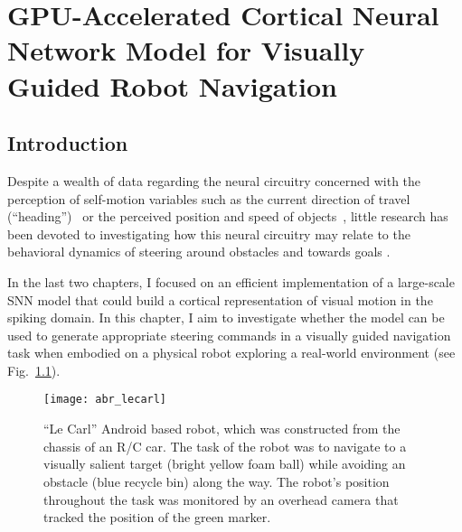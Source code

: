 \chapter{GPU-Accelerated Cortical Neural Network Model for 
Visually Guided Robot Navigation}
\label{ch:ABR}

\section{Introduction}
Despite a wealth of data regarding the neural
circuitry concerned with the perception of self-motion variables
such as the current direction of travel
(``heading'')~\citep{BrittenNewsome1998,DuffyWurtz1997,Gu2006}
or the perceived position and speed of
objects~\citep{EifukuWurtz1998,Tanaka1993},
little research has been devoted to investigating how this neural
circuitry may relate to the behavioral dynamics of steering around
obstacles and towards goals \citep{FajenWarren2003,WilkieWann2003}.

In the last two chapters, I focused on an efficient implementation
of a large-scale \ac{SNN} model that could build a cortical representation
of visual motion in the spiking domain.
In this chapter, I aim to investigate whether the model can be used to
generate appropriate steering commands in a visually guided navigation task
when embodied on a physical robot exploring a real-world environment
(see Fig.~\ref{fig:ABR|LeCarl}).

\begin{figure}[t]
  \centering
  \texttt{[image: abr\_lecarl]}
  \caption{
  ``Le Carl'' Android based robot, which was constructed from the
  chassis of an R/C car. The task of the robot was to navigate to
  a visually salient target (bright yellow foam ball) while
  avoiding an obstacle (blue recycle bin) along the way.
  The robot's position throughout the task was monitored by an
  overhead camera that tracked the position of the green marker.}
  \label{fig:ABR|LeCarl}
\end{figure}

